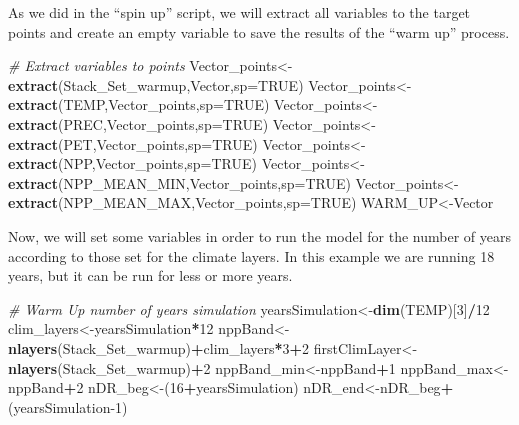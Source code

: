 \documentclass[
  10pt,
  b5paper,
]{book}
\newenvironment{Shaded}{\begin{snugshade}}{\end{snugshade}}
\newcommand{\CommentTok}[1]{\textcolor[rgb]{0.56,0.35,0.01}{\textit{#1}}}
\newcommand{\DataTypeTok}[1]{\textcolor[rgb]{0.13,0.29,0.53}{#1}}
\newcommand{\DecValTok}[1]{\textcolor[rgb]{0.00,0.00,0.81}{#1}}
\newcommand{\KeywordTok}[1]{\textcolor[rgb]{0.13,0.29,0.53}{\textbf{#1}}}
\newcommand{\NormalTok}[1]{#1}
\newcommand{\OperatorTok}[1]{\textcolor[rgb]{0.81,0.36,0.00}{\textbf{#1}}}
\newcommand{\OtherTok}[1]{\textcolor[rgb]{0.56,0.35,0.01}{#1}}
\begin{document}
As we did in the ``spin up'' script, we will extract all variables to the target points and create an empty variable to save the results of the ``warm up'' process.

\begin{Shaded}
\begin{Highlighting}[]
\CommentTok{# Extract variables to points}
\NormalTok{Vector_points<-}\KeywordTok{extract}\NormalTok{(Stack_Set_warmup,Vector,}\DataTypeTok{sp=}\OtherTok{TRUE}\NormalTok{)}
\NormalTok{Vector_points<-}\KeywordTok{extract}\NormalTok{(TEMP,Vector_points,}\DataTypeTok{sp=}\OtherTok{TRUE}\NormalTok{)}
\NormalTok{Vector_points<-}\KeywordTok{extract}\NormalTok{(PREC,Vector_points,}\DataTypeTok{sp=}\OtherTok{TRUE}\NormalTok{)}
\NormalTok{Vector_points<-}\KeywordTok{extract}\NormalTok{(PET,Vector_points,}\DataTypeTok{sp=}\OtherTok{TRUE}\NormalTok{)}
\NormalTok{Vector_points<-}\KeywordTok{extract}\NormalTok{(NPP,Vector_points,}\DataTypeTok{sp=}\OtherTok{TRUE}\NormalTok{)}
\NormalTok{Vector_points<-}\KeywordTok{extract}\NormalTok{(NPP_MEAN_MIN,Vector_points,}\DataTypeTok{sp=}\OtherTok{TRUE}\NormalTok{)}
\NormalTok{Vector_points<-}\KeywordTok{extract}\NormalTok{(NPP_MEAN_MAX,Vector_points,}\DataTypeTok{sp=}\OtherTok{TRUE}\NormalTok{)}
\NormalTok{WARM_UP<-Vector}
\end{Highlighting}
\end{Shaded}

Now, we will set some variables in order to run the model for the number of years according to those set for the climate layers. In this example we are running 18 years, but it can be run for less or more years.

\begin{Shaded}
\begin{Highlighting}[]
\CommentTok{# Warm Up number of years simulation }
\NormalTok{yearsSimulation<-}\KeywordTok{dim}\NormalTok{(TEMP)[}\DecValTok{3}\NormalTok{]}\OperatorTok{/}\DecValTok{12}
\NormalTok{clim_layers<-yearsSimulation}\OperatorTok{*}\DecValTok{12}
\NormalTok{nppBand<-}\KeywordTok{nlayers}\NormalTok{(Stack_Set_warmup)}\OperatorTok{+}\NormalTok{clim_layers}\OperatorTok{*}\DecValTok{3}\OperatorTok{+}\DecValTok{2}
\NormalTok{firstClimLayer<-}\KeywordTok{nlayers}\NormalTok{(Stack_Set_warmup)}\OperatorTok{+}\DecValTok{2}
\NormalTok{nppBand_min<-nppBand}\OperatorTok{+}\DecValTok{1}
\NormalTok{nppBand_max<-nppBand}\OperatorTok{+}\DecValTok{2}
\NormalTok{nDR_beg<-(}\DecValTok{16}\OperatorTok{+}\NormalTok{yearsSimulation)}
\NormalTok{nDR_end<-nDR_beg}\OperatorTok{+}\NormalTok{(yearsSimulation}\DecValTok{-1}\NormalTok{)}
\end{Highlighting}
\end{Shaded}
\end{document}
